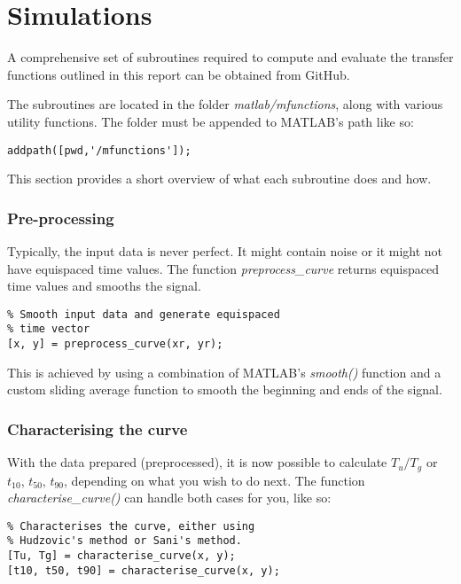 \section{Simulations}

A comprehensive set of subroutines required to compute and evaluate the transfer
functions    outlined    in    this    report    can     be     obtained    from
GitHub\cite{ref:TheComet93}.

The subroutines are located in the folder \textit{matlab/mfunctions}, along with
various utility functions. The folder must be appended to MATLAB's path like so:

\begin{lstlisting}
addpath([pwd,'/mfunctions']);
\end{lstlisting}

This section provides a short overview  of  what  each  subroutine does and how.


\subsubsection*{Pre-processing}

Typically, the  input  data is never perfect. It might contain noise or it might
not have equispaced time values. The function \textit{preprocess\_curve} returns
equispaced time values and smooths the signal.

\begin{lstlisting}
% Smooth input data and generate equispaced
% time vector
[x, y] = preprocess_curve(xr, yr);
\end{lstlisting}

This is achieved  by  using a combination of MATLAB's \textit{smooth()} function
and a custom sliding average  function  to  smooth the beginning and ends of the
signal.


\subsubsection*{Characterising the curve}

With the data prepared (preprocessed), it is now possible to calculate $T_u/T_g$
or $t_{10}$, $t_{50}$, $t_{90}$, depending on  what  you  wish  to  do next. The
function \textit{characterise\_curve()}  can handle both cases for you, like so:

\begin{lstlisting}
% Characterises the curve, either using
% Hudzovic's method or Sani's method.
[Tu, Tg] = characterise_curve(x, y);
[t10, t50, t90] = characterise_curve(x, y);
\end{lstlisting}

